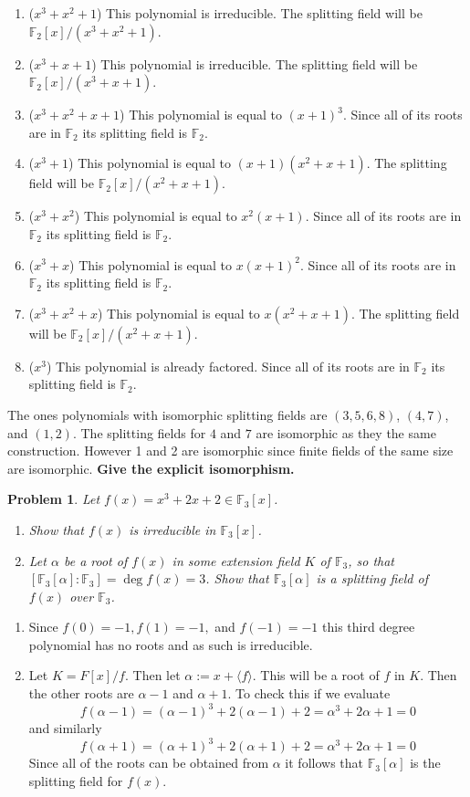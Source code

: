 \documentclass[10pt]{article}
\newcommand{\sk}{\vskip 10mm}
\newcommand{\bb}[1]{\mathbb{#1}}
\theoremstyle{plain}
\newtheorem{problem}{Problem}
\theoremstyle{remark}
\begin{document}
\begin{enumerate}
\item ($x^3+x^2+1$) This polynomial is irreducible. The splitting field will
  be $\bb{F}_2[x]/(x^3+x^2+1)$.
\item ($x^3+x+1$) This polynomial is irreducible. The splitting field will
  be $\bb{F}_2[x]/(x^3+x+1)$.
\item ($x^3+x^2+x+1$) This polynomial is equal to $(x+1)^3$. Since all of its roots
  are in $\bb{F}_2$ its splitting field is $\bb{F}_2$.
\item ($x^3+1$) This polynomial is equal to $(x+1)(x^2+x+1)$. The splitting
  field will be $\bb{F}_2[x]/(x^2+x+1)$.
\item ($x^3+x^2$) This polynomial is equal to $x^2(x+1)$. Since all of its roots
  are in $\bb{F}_2$ its splitting field is $\bb{F}_2$.
\item ($x^3+x$) This polynomial is equal to $x(x+1)^2$. Since all of its roots
  are in $\bb{F}_2$ its splitting field is $\bb{F}_2$.
\item ($x^3+x^2+x$) This polynomial is equal to $x(x^2+x+1)$. The splitting field
  will be $\bb{F}_2[x]/(x^2+x+1)$.
\item ($x^3$) This polynomial is already factored. Since all of its roots
  are in $\bb{F}_2$ its splitting field is $\bb{F}_2$.
\end{enumerate}

The ones polynomials with isomorphic splitting fields are $(3,5,6,8)$, $(4,7)$, and $(1,2)$.
The splitting fields for $4$ and $7$ are isomorphic as they the same construction.
However 1 and 2 are isomorphic since finite fields of the same size are isomorphic.
\textbf{Give the explicit isomorphism.}

\sk

\begin{problem}
  Let $f(x) = x^3 + 2x + 2 \in \mathbb{F}_3[x]$.
\begin{enumerate}
    \item Show that $f(x)$ is irreducible in $\mathbb{F}_3[x]$.
    \item Let $\alpha$ be a root of $f(x)$ in some extension field $K$
      of $\mathbb{F}_3$, so that
      $[\mathbb{F}_3[\alpha]: \mathbb{F}_3] = \deg f(x) = 3$.
      Show that $\mathbb{F}_3[\alpha]$ is a splitting field of $f(x)$
      over $\mathbb{F}_3$.
\end{enumerate}
\end{problem}

\begin{enumerate}
\item Since $f(0)=-1, f(1)=-1,$ and $f(-1)=-1$ this third degree polynomial has no
  roots and as such is irreducible.
\item Let $K=F[x]/f$. Then let $\alpha:=x+\langle f\rangle$. This will be a root of $f$ in
  $K$. Then the other roots are $\alpha-1$ and $\alpha+1$. To check this if we evaluate
  \[f(\alpha-1)=(\alpha-1)^3+2(\alpha-1)+2=\alpha^3+2\alpha+1=0\]
  and similarly
  \[f(\alpha+1)=(\alpha+1)^3+2(\alpha+1)+2=\alpha^3+2\alpha+1=0 \]
  Since all of the roots can be obtained from $\alpha$ it follows that $\bb{F}_3[\alpha]$
  is the splitting field for $f(x)$.
\end{enumerate}
\end{document}
